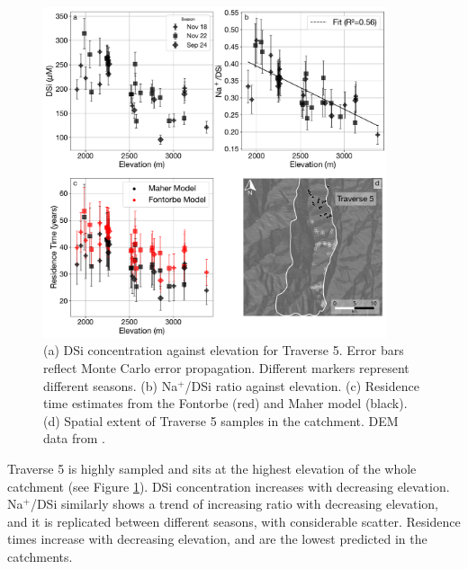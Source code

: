 \begin{figure}[h]
    \centering
        \includegraphics[width=0.9\textwidth]{Traverse_5_summary.pdf}
    \caption{(a) DSi concentration against elevation for Traverse 5. Error bars reflect Monte Carlo error propagation. Different markers represent different seasons. (b) Na$^+$/DSi ratio against elevation. (c) Residence time estimates from the Fontorbe (red) and Maher model (black). (d) Spatial extent of Traverse 5 samples in the catchment. DEM data from \textcite{asterGlobalDigitalElevation2018}.}
    \label{fig:trav5}
\end{figure}

\FloatBarrier

Traverse 5 is highly sampled and sits at the highest elevation of the whole catchment (see Figure \ref{fig:trav5}). DSi concentration increases with decreasing elevation. Na$^+$/DSi similarly shows a trend of increasing ratio with decreasing elevation, and it is replicated between different seasons, with considerable scatter. Residence times increase with decreasing elevation, and are the lowest predicted in the catchments.

\newpage

